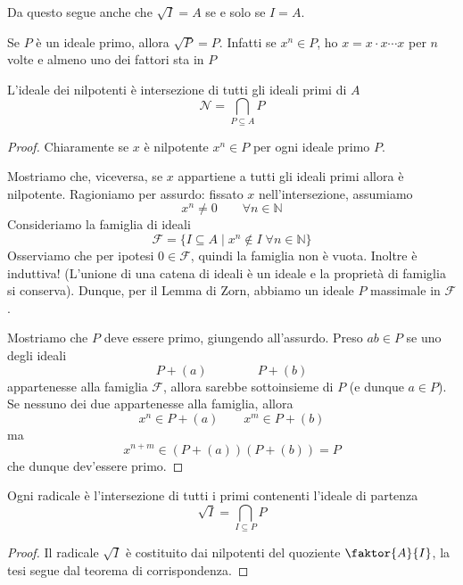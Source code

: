 \begin{multicols}{2}
\begin{remark}
	Da questo segue anche che $ \sqrt{I} = A $ se e solo se $ I = A $.
\end{remark}
\begin{remark}
	Se $ P $ è un ideale primo, allora $ \boxed{\sqrt{P} = P} $. Infatti se $ x^n \in P $, ho $ x = x \cdot x \cdots x $ per $ n $ volte e almeno uno dei fattori sta in $ P $
\end{remark}

\begin{prop}
	L'ideale dei nilpotenti è intersezione di tutti gli ideali primi di $ A $
	$$  \mathcal{N} = \bigcap_{P \subseteq A} P  $$
\end{prop}
\begin{proof}
	Chiaramente se $ x $ è nilpotente $ x ^n \in P $ per ogni ideale primo $ P $.
	
	Mostriamo che, viceversa, se $ x $ appartiene a tutti gli ideali primi allora è nilpotente. Ragioniamo per assurdo: fissato $ x $ nell'intersezione, assumiamo $$  x^n \neq 0 \qquad \forall n \in \mathbb{N} $$ Consideriamo la famiglia di ideali
	$$  \mathcal{F} = \{ I \subseteq A \mid x^n \notin I \;\forall n \in \mathbb{N}  \}  $$
	Osserviamo che per ipotesi $ {0} \in \mathcal{F} $, quindi la famiglia non è vuota. Inoltre è induttiva! (L'unione di una catena di ideali è un ideale e la proprietà di famiglia si conserva). Dunque, per il Lemma di Zorn, abbiamo un ideale $ P $ massimale in $ \mathcal F $.
	
	Mostriamo che $ P $ deve essere primo, giungendo all'assurdo. Preso $ ab \in P $ se uno degli ideali 
	\[ P + (a) \qquad \qquad P + (b) \]
	appartenesse alla famiglia $ \mathcal{F} $, allora sarebbe sottoinsieme di $ P $ (e dunque $ a \in P $). Se nessuno dei due appartenesse alla famiglia, allora
	\[ x^n \in P + (a) \qquad x^m \in P + (b) \]
	ma
	\[ x^{n + m} \in (P + (a))(P + (b)) = P \]
	che dunque dev'essere primo.
\end{proof}
\begin{theorem}
	Ogni radicale è l'intersezione di tutti i primi contenenti l'ideale di partenza
	$$  \sqrt{I} = \bigcap_{I \subseteq P} P  $$
\end{theorem}
\begin{proof}
	Il radicale $ \sqrt{I} $ è costituito dai nilpotenti del quoziente $ \faktor{A}{I} $, la tesi segue dal teorema di corrispondenza.
\end{proof}

\end{multicols}

